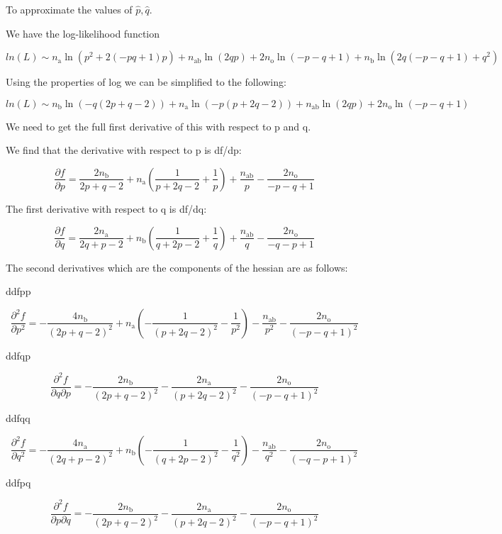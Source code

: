 \documentclass[]{article}
\begin{document}
To approximate the values of \(\hat{p}, \hat{q}.\)

We have the log-likelihood function

\[ln(L) \sim n_\text{a}\ln\left(p^2+2\left(-p q+1\right)p\right)+n_\text{ab}\ln\left(2qp\right)+2n_\text{o}\ln\left(-p-q+1\right)+n_\text{b}\ln\left(2q\left(-p-q+1\right)+q^2\right)
\]

Using the properties of log we can be simplified to the following:

\[ln(L) \sim n_\text{b}\ln\left(-q\left(2p+q-2\right)\right)+n_\text{a}\ln\left(-p\left(p+2q-2\right)\right)+n_\text{ab}\ln\left(2qp\right)+2n_\text{o}\ln\left(-p-q+1\right)
\]

We need to get the full first derivative of this with respect to p and
q.

We find that the derivative with respect to p is df/dp:

\[ \frac{\partial f}{\partial p } = \dfrac{2n_\text{b}}{2p+q-2}+n_\text{a}\left(\dfrac{1}{p+2q-2}+\dfrac{1}{p}\right)+\dfrac{n_\text{ab}}{p}-\dfrac{2n_\text{o}}{-p-q+1}
\]

The first derivative with respect to q is df/dq:

\[\frac{\partial f}{\partial q } = \dfrac{2n_\text{a}}{2q+p-2}+n_\text{b}\left(\dfrac{1}{q+2p-2}+\dfrac{1}{q}\right)+\dfrac{n_\text{ab}}{q}-\dfrac{2n_\text{o}}{-q-p+1}
\]

The second derivatives which are the components of the hessian are as
follows:

ddfpp

\[ \frac{\partial^2 f}{\partial p^2} = -\dfrac{4n_\text{b}}{\left(2p+q-2\right)^2}+n_\text{a}\left(-\dfrac{1}{\left(p+2q-2\right)^2}-\dfrac{1}{p^2}\right)-\dfrac{n_\text{ab}}{p^2}-\dfrac{2n_\text{o}}{\left(-p-q+1\right)^2}
\]

ddfqp

\[\frac{\partial^2 f}{\partial q \partial p } = -\dfrac{2n_\text{b}}{\left(2p+q-2\right)^2}-\dfrac{2n_\text{a}}{\left(p+2q-2\right)^2}-\dfrac{2n_\text{o}}{\left(-p-q+1\right)^2}
\]

ddfqq

\[ \frac{\partial^2 f}{\partial q^2} = -\dfrac{4n_\text{a}}{\left(2q+p-2\right)^2}+n_\text{b}\left(-\dfrac{1}{\left(q+2p-2\right)^2}-\dfrac{1}{q^2}\right)-\dfrac{n_\text{ab}}{q^2}-\dfrac{2n_\text{o}}{\left(-q-p+1\right)^2}
\]

ddfpq

\[\frac{\partial^2 f}{\partial p \partial q } =-\dfrac{2n_\text{b}}{\left(2p+q-2\right)^2}-\dfrac{2n_\text{a}}{\left(p+2q-2\right)^2}-\dfrac{2n_\text{o}}{\left(-p-q+1\right)^2}
\]
\end{document}
